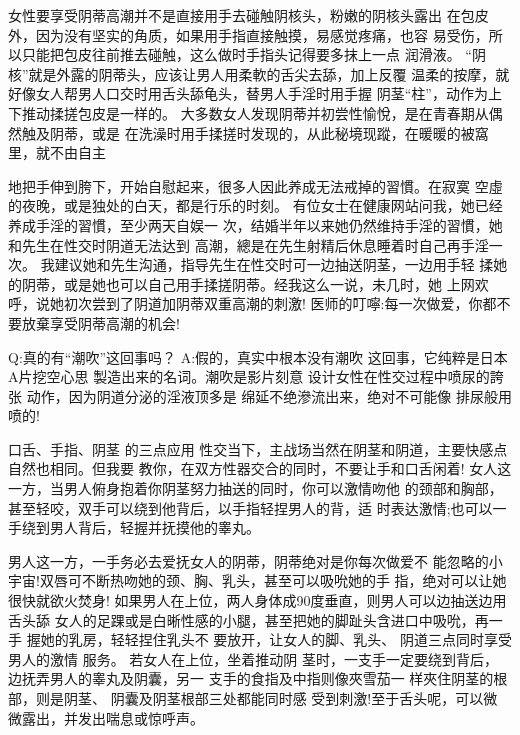 \documentclass[12pt,UTF8]{ctexbook}
\begin{document}
女性要享受阴蒂高潮并不是直接用手去碰触阴核头，粉嫩的阴核头露出
在包皮外，因为没有坚实的角质，如果用手指直接触摸，易感觉疼痛，也容
易受伤，所以只能把包皮往前推去碰触，这么做时手指头记得要多抹上一点
润滑液。
“阴核”就是外露的阴蒂头，应该让男人用柔軟的舌尖去舔，加上反覆
温柔的按摩，就好像女人帮男人口交时用舌头舔龟头，替男人手淫时用手握
阴茎“柱”，动作为上下推动揉搓包皮是一样的。
大多数女人发现阴蒂并初尝性愉悅，是在青春期从偶然触及阴蒂，或是
在洗澡时用手揉搓时发现的，从此秘境现蹤，在暖暖的被窩里，就不由自主

地把手伸到胯下，开始自慰起来，很多人因此养成无法戒掉的習慣。在寂寞
空虛的夜晚，或是独处的白天，都是行乐的时刻。
有位女士在健康网站问我，她已经养成手淫的習慣，至少两天自娱一
次，结婚半年以来她仍然维持手淫的習慣，她和先生在性交时阴道无法达到
高潮，總是在先生射精后休息睡着时自己再手淫一次。
我建议她和先生沟通，指导先生在性交时可一边抽送阴茎，一边用手轻
揉她的阴蒂，或是她也可以自己用手揉搓阴蒂。经我这么一说，未几时，她
上网欢呼，说她初次尝到了阴道加阴蒂双重高潮的刺激!
医师的叮嚀:每一次做爱，你都不要放棄享受阴蒂高潮的机会!

Q:真的有“潮吹”这回事吗？
A:假的，真实中根本没有潮吹
这回事，它纯粹是日本A片挖空心思
製造出来的名词。潮吹是影片刻意
设计女性在性交过程中喷尿的誇张
动作，因为阴道分泌的淫液顶多是
绵延不绝滲流出来，绝对不可能像
排尿般用喷的!

口舌、手指、阴茎
的三点应用
性交当下，主战场当然在阴茎和阴道，主要快感点自然也相同。但我要
教你，在双方性器交合的同时，不要让手和口舌闲着!
女人这一方，当男人俯身抱着你阴茎努力抽送的同时，你可以激情吻他
的颈部和胸部，甚至轻咬，双手可以绕到他背后，以手指轻捏男人的背，适
时表达激情;也可以一手绕到男人背后，轻握并抚摸他的睾丸。

男人这一方，一手务必去爱抚女人的阴蒂，阴蒂绝对是你每次做爱不
能忽略的小宇宙!双唇可不断热吻她的颈、胸、乳头，甚至可以吸吮她的手
指，绝对可以让她很快就欲火焚身!
如果男人在上位，两人身体成90度垂直，则男人可以边抽送边用舌头舔
女人的足踝或是白晰性感的小腿，甚至把她的脚趾头含进口中吸吮，再一手
握她的乳房，轻轻捏住乳头不
要放开，让女人的脚、乳头、
阴道三点同时享受男人的激情
服务。
若女人在上位，坐着推动阴
茎时，一支手一定要绕到背后，
边抚弄男人的睾丸及阴囊，另一
支手的食指及中指则像夾雪茄一
样夾住阴茎的根部，则是阴茎、
阴囊及阴茎根部三处都能同时感
受到刺激!至于舌头呢，可以微
微露出，并发出喘息或惊呼声。
\end{document}
